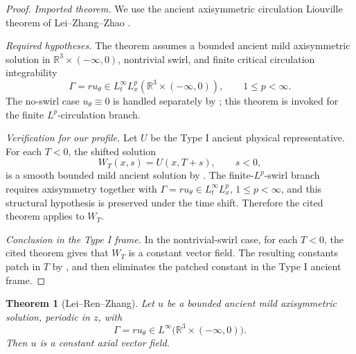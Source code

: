 \documentclass[11pt]{amsart}
\theoremstyle{plain}
\newtheorem{theorem}{Theorem}[section]
\theoremstyle{definition}
\theoremstyle{remark}
\numberwithin{equation}{section}
\newcommand{\R}{\mathbb R}
\begin{document}
\begin{proof}
\smallskip
\noindent\emph{Imported theorem.}
We use the ancient axisymmetric circulation Liouville theorem of
Lei--Zhang--Zhao \cite[Theorem 1.3]{LZZ}.

\smallskip
\noindent\emph{Required hypotheses.}
The theorem assumes a bounded ancient mild axisymmetric solution in
\(\R^3\times(-\infty,0)\), nontrivial swirl, and finite critical circulation integrability
\[
   \Gamma=ru_\theta
   \in L_t^\infty L_x^p(\R^3\times(-\infty,0)),
   \qquad 1\le p<\infty .
\]
The no-swirl case \(u_\theta\equiv0\) is handled separately by
; this theorem is invoked for the finite
\(L^p\)-circulation branch.

\smallskip
\noindent\emph{Verification for our profile.}
Let \(U\) be the Type I ancient physical representative.  For each \(T<0\),
the shifted solution
\[
   W_T(x,s)=U(x,T+s),\qquad s<0,
\]
is a smooth bounded mild ancient solution by .  The
finite-\(L^p\)-swirl branch requires axisymmetry together with
\(\Gamma=ru_\theta\in L_t^\infty L_x^p\), \(1\le p<\infty\), and this
structural hypothesis is preserved under the time shift.  Therefore the cited
theorem applies to \(W_T\).

\smallskip
\noindent\emph{Conclusion in the Type I frame.}
In the nontrivial-swirl case, for each \(T<0\), the cited theorem gives that
\(W_T\) is a constant vector field.  The resulting constants patch in \(T\) by
, and  then
eliminates the patched constant in the Type I ancient frame.
\end{proof}

\begin{theorem}[Lei--Ren--Zhang]
\label{p3:thm:lrz}
Let \(u\) be a bounded ancient mild axisymmetric solution, periodic in \(z\),
with
\[
   \Gamma=ru_\theta\in L^\infty
   \bigl(\mathbb R^3\times(-\infty,0)\bigr).
\]
Then \(u\) is a constant axial vector field.
\end{theorem}
\end{document}
